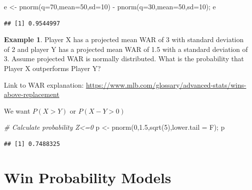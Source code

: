 \documentclass[
  11pt,
]{book}
\newenvironment{Shaded}{\begin{snugshade}}{\end{snugshade}}
\newcommand{\AttributeTok}[1]{\textcolor[rgb]{0.77,0.63,0.00}{#1}}
\newcommand{\CommentTok}[1]{\textcolor[rgb]{0.56,0.35,0.01}{\textit{#1}}}
\newcommand{\DecValTok}[1]{\textcolor[rgb]{0.00,0.00,0.81}{#1}}
\newcommand{\FloatTok}[1]{\textcolor[rgb]{0.00,0.00,0.81}{#1}}
\newcommand{\FunctionTok}[1]{\textcolor[rgb]{0.00,0.00,0.00}{#1}}
\newcommand{\NormalTok}[1]{#1}
\newcommand{\OtherTok}[1]{\textcolor[rgb]{0.56,0.35,0.01}{#1}}
\newcommand{\SpecialCharTok}[1]{\textcolor[rgb]{0.00,0.00,0.00}{#1}}
\theoremstyle{definition}
\theoremstyle{definition}
\newtheorem{example}{Example}[chapter]
\theoremstyle{definition}
\theoremstyle{definition}
\theoremstyle{remark}
\begin{document}
\begin{Shaded}
\begin{Highlighting}[]
\NormalTok{e }\OtherTok{\textless{}{-}} \FunctionTok{pnorm}\NormalTok{(}\AttributeTok{q=}\DecValTok{70}\NormalTok{,}\AttributeTok{mean=}\DecValTok{50}\NormalTok{,}\AttributeTok{sd=}\DecValTok{10}\NormalTok{) }\SpecialCharTok{{-}} \FunctionTok{pnorm}\NormalTok{(}\AttributeTok{q=}\DecValTok{30}\NormalTok{,}\AttributeTok{mean=}\DecValTok{50}\NormalTok{,}\AttributeTok{sd=}\DecValTok{10}\NormalTok{); e}
\end{Highlighting}
\end{Shaded}

\begin{verbatim}
## [1] 0.9544997
\end{verbatim}

\newpage

\begin{example}
Player X has a projected mean WAR of 3 with standard deviation of 2 and player Y has a projected mean WAR of 1.5 with a standard deviation of 3. Assume projected WAR is normally distributed. What is the probability that Player X outperforms Player Y?

Link to WAR explanation: \url{https://www.mlb.com/glossary/advanced-stats/wins-above-replacement}
\end{example}

We want \(P(X>Y)\) or \(P(X-Y>0)\)\\

\vfill

\begin{Shaded}
\begin{Highlighting}[]
\CommentTok{\# Calculate probability Z\textless{}=0}
\NormalTok{p }\OtherTok{\textless{}{-}} \FunctionTok{pnorm}\NormalTok{(}\DecValTok{0}\NormalTok{,}\FloatTok{1.5}\NormalTok{,}\FunctionTok{sqrt}\NormalTok{(}\DecValTok{5}\NormalTok{),}\AttributeTok{lower.tail =}\NormalTok{ F); p}
\end{Highlighting}
\end{Shaded}

\begin{verbatim}
## [1] 0.7488325
\end{verbatim}

\vfill

\newpage

\hypertarget{win-probability-models}{%
\section{Win Probability Models}\label{win-probability-models}}
\end{document}
